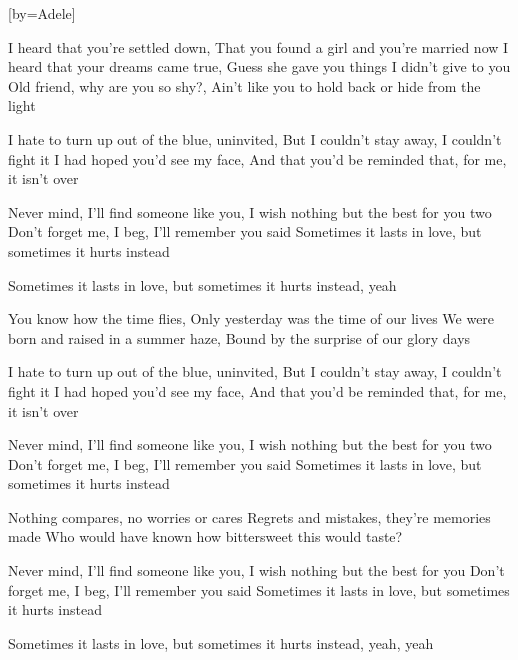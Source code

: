  

[by=Adele]




\beginverse
I heard that you're settled down, \brk  That you found a girl and you're married now
I heard that your dreams came true, \brk  Guess she gave you things I didn't give to you
Old friend, why are you so shy?, \brk  Ain't like you to hold back or hide from the light
\endverse

\beginverse
I hate to turn up out of the blue, uninvited, \brk  But I couldn't stay away, I couldn't fight it
I had hoped you'd see my face, \brk  And that you'd be reminded that, for me, it isn't over
\endverse

\beginchorus
Never mind, I'll find someone like you, \brk  I wish nothing but the best for you two
Don't forget me, I beg, \brk  I'll remember you said
Sometimes it lasts in love, but sometimes it hurts instead
\endchorus

\beginchorus
Sometimes it lasts in love, but sometimes it hurts instead, yeah
\endchorus

\beginverse
You know how the time flies, \brk  Only yesterday was the time of our lives
We were born and raised in a summer haze, \brk  Bound by the surprise of our glory days
\endverse

\beginverse
I hate to turn up out of the blue, uninvited, \brk  But I couldn't stay away, I couldn't fight it
I had hoped you'd see my face, \brk  And that you'd be reminded that, for me, it isn't over
\endverse

\beginchorus
Never mind, I'll find someone like you, \brk  I wish nothing but the best for you two
Don't forget me, I beg, \brk  I'll remember you said
Sometimes it lasts in love, but sometimes it hurts instead
\endchorus

\beginverse
Nothing compares, no worries or cares
Regrets and mistakes, they're memories made
Who would have known how bittersweet this would taste?
\endverse

\beginchorus
{}
Never mind, I'll find someone like you, \brk  I wish nothing but the best for you
Don't forget me, I beg, \brk  I'll remember you said
Sometimes it lasts in love, but sometimes it hurts instead
\endchorus

\beginchorus
Sometimes it lasts in love, but sometimes it hurts instead, yeah, yeah
\endchorus



\endsong
